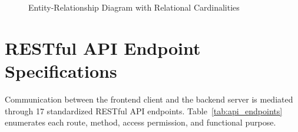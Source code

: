 \documentclass[11pt,a4paper]{report}
\begin{document}
\begin{figure}[H]
\caption{Entity-Relationship Diagram with Relational Cardinalities}
\label{fig:tikz_erd}
\end{figure}

\section{RESTful API Endpoint Specifications}
\justifying
Communication between the frontend client and the backend server is mediated through 17 standardized RESTful API endpoints. Table~\ref{tab:api_endpoints} enumerates each route, method, access permission, and functional purpose.
\end{document}

